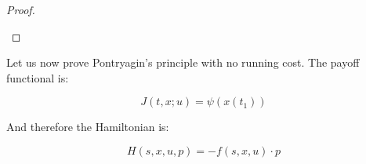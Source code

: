 \begin{lemma}
\begin{proof}
\begin{itemize}
            \color{red}{If $s>r$ then:}


        \end{itemize}
    \end{proof}
\end{lemma}

Let us now prove Pontryagin's principle with no running cost. The payoff functional is:

\begin{equation}\label{1-proofpontry-norunfunct}
    J(t,x;u) = \psi(x(t_1))
\end{equation}

And therefore the Hamiltonian is:

\begin{equation}\label{1-proofpontry-norunham}
    H(s,x,u,p) = - f(s,x,u)\cdot p 
\end{equation}

